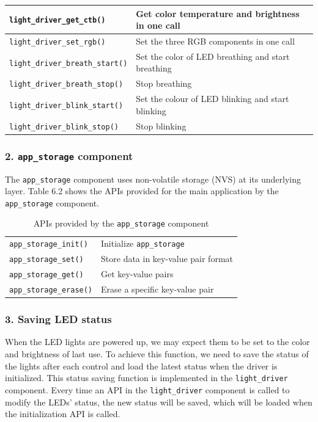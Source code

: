 \documentclass[a4paper,12pt,openany]{book}
\renewcommand{\arraystretch}{1}
\begin{document}
{\begin{longtable}{|>{\footnotesize}m{}|>{\footnotesize}m{}|}
    \hline
    \verb|light_driver_get_ctb()|&Get color temperature and brightness in one call\\
    \hline
    \verb|light_driver_set_rgb()|&Set the three RGB components in one call\\
    \hline
    \verb|light_driver_breath_start()|&Set the color of LED breathing and start breathing\\
    \hline
    \verb|light_driver_breath_stop()|&Stop breathing\\
    \hline
    \verb|light_driver_blink_start()|&Set the colour of LED blinking and start blinking\\
    \hline
    \verb|light_driver_blink_stop()|&Stop blinking\\
    \hline
\end{longtable}
}

\subsubsection{2. \texttt{app\_storage} component}

The \verb|app_storage| component uses non-volatile storage (NVS) at its underlying layer. Table 6.2 shows the APIs provided for the main application by the \verb|app_storage| component.

\begin{table}[h!]
    \renewcommand{\arraystretch}{1.2}
    \caption{APIs provided by the \texttt{app\_storage} component}
    \begin{tabular}{|>{\footnotesize}m{}|>{\footnotesize}m{}|}
        \hline
        \rowcolor{LightBlue}\multicolumn{1}{|c|}{\textbf{API}}&\multicolumn{1}{c|}{\textbf{Function}}\\
        \hline
        \verb|app_storage_init()|&Initialize \verb|app_storage|\\
        \hline
        \verb|app_storage_set()|&Store data in key-value pair format\\
        \hline
        \verb|app_storage_get()|&Get key-value pairs\\
        \hline
        \verb|app_storage_erase()|&Erase a specific key-value pair\\
        \hline
    \end{tabular}
\end{table}

\subsubsection{3. Saving LED status}
When the LED lights are powered up, we may expect them to be set to the color and brightness of last use. To achieve this function, we need to save the status of the lights after each control and load the latest status when the driver is initialized. This status saving function is implemented in the \verb|light_driver| component. Every time an API in the \verb|light_driver| component is called to modify the LEDs’ status, the new status will be saved, which will be loaded when the initialization API is called.
\end{document}
